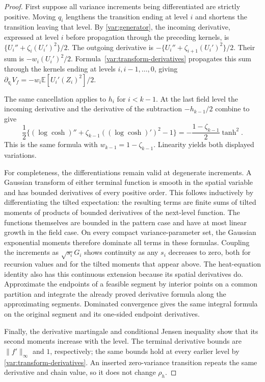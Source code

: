 \begin{proof}
First suppose all variance increments being differentiated are
strictly positive. Moving $q_i$ lengthens the transition ending at
level $i$ and shortens the transition leaving that level. By
\eqref{var:generator}, the incoming derivative, expressed at level
$i$ before propagation through the preceding kernels, is
$\{U_i''+\zeta_i(U_i')^2\}/2$. The outgoing derivative is
$-\{U_i''+\zeta_{i+1}(U_i')^2\}/2$. Their sum is
$-w_i(U_i')^2/2$. Formula~\eqref{var:transform-derivatives}
propagates this sum through the kernels ending at levels
$i,i-1,\ldots,0$, giving
$\partial_{q_i}V_f=-w_i\mathbb E[U_i'(Z_i)^2]/2$.

The same cancellation applies to $h_i$ for $i<k-1$.
At the last field level the incoming derivative and the derivative
of the subtraction $-h_{k-1}/2$ combine to give
\[
 \frac12\{(\log\cosh)''+
            \zeta_{k-1}((\log\cosh)')^2-1\}
 =-\frac{1-\zeta_{k-1}}2\tanh^2.
\]
This is the same formula with $w_{k-1}=1-\zeta_{k-1}$.
Linearity yields both displayed variations.

For completeness, the differentiations remain valid at degenerate
increments. A Gaussian transform of either terminal function is
smooth in the spatial variable and has bounded derivatives of every
positive order. This follows inductively by differentiating the
tilted expectation: the resulting terms are finite sums of tilted
moments of products of bounded derivatives of the next-level
function. The functions themselves are bounded in the pattern
case and have at most linear growth in the field case. On every
compact variance-parameter set, the Gaussian exponential moments
therefore dominate all terms in these formulas. Coupling the
increments as $\sqrt{s_i}G_i$ shows continuity as any $s_i$
decreases to zero, both for recursion values and for the tilted
moments that appear above. The heat-equation identity also has
this continuous extension because its spatial derivatives do.
Approximate the endpoints of a feasible segment by interior points
on a common partition and integrate the already proved derivative
formula along the approximating segments. Dominated convergence
gives the same integral formula on the original segment and its
one-sided endpoint derivatives.

Finally, the derivative martingale and conditional Jensen inequality
show that its second moments increase with the level. The terminal
derivative bounds are $\|f'\|_\infty$ and $1$, respectively;
the same bounds hold at every earlier level by
\eqref{var:transform-derivatives}. An inserted zero-variance
transition repeats the same derivative and chain value, so it
does not change $\rho_h$.
\end{proof}

